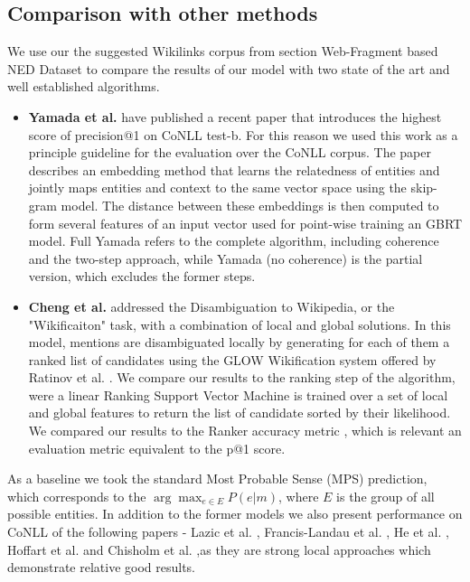 \documentclass[11pt]{article}
\begin{document}
	\subsection{Comparison with other methods}
	We use our the suggested Wikilinks corpus from section \refname{Web-Fragment based NED Dataset} to compare the results of our model with two state of the art and well established algorithms.
	
	\begin{itemize} 
		\item  \textbf{Yamada et al.} \cite{Yamada2016} have published a recent paper that introduces the highest score of precision@1 on CoNLL test-b. For this reason we used this work as a principle guideline for the evaluation over the CoNLL corpus. The paper describes an embedding method that learns the relatedness of entities and jointly maps entities and context to the same vector space using the skip-gram model. The distance between these embeddings is then computed to form several features  of an input vector used for point-wise training an GBRT model. Full Yamada refers to the complete algorithm, including coherence and the two-step approach, while Yamada (no coherence) is the partial version, which excludes the former steps.
		
		\item \textbf{Cheng et al.} \cite{Cheng2013} addressed the Disambiguation to Wikipedia, or the "Wikificaiton" task, with a combination of local and global solutions. In this model, mentions are disambiguated locally by generating for each of them a ranked list of candidates using the GLOW Wikification system offered by Ratinov et al. \cite{Ratinov2011}. We compare our results to the ranking step of the algorithm, were a linear Ranking Support Vector Machine is trained over a set of local and global features to return the list of candidate sorted by their likelihood. We compared our results to the Ranker accuracy metric , which is relevant an evaluation metric equivalent to the p@1 score.
	\end{itemize}
	
	As a baseline we took the standard Most Probable Sense (MPS) prediction, which corresponds to the $\arg\max_{e\in{{E}}}{P(e|m)}$, where $E$ is the group of all possible entities.
	In addition to the former models we also present performance on CoNLL of the following papers - Lazic et al. \cite{Lazic2015}, Francis-Landau et al. \cite{Francis-Landau2016}, He et al. \cite{He2013}, Hoffart et al. \cite{hoffart2011robust} and Chisholm et al. \cite{Chisholm2015} ,as they are strong local approaches which demonstrate relative good results.
	
\end{document}

